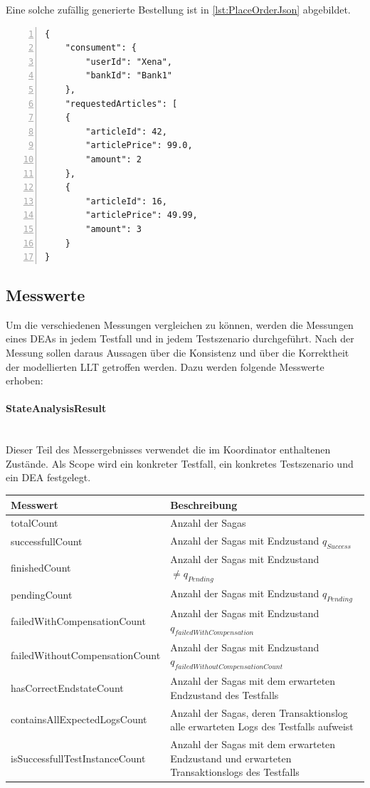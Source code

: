 Eine solche zufällig generierte Bestellung ist in \cref{lst:PlaceOrderJson} abgebildet.


\begin{lstlisting}[breaklines=true, tabsize=2, showstringspaces=false, frame=single, numbers=left, basicstyle=\small, label = {lst:PlaceOrderJson}, caption={Json für dynamisch generierte Bestellung}, captionpos=b] 
{
	"consument": {
		"userId": "Xena",
		"bankId": "Bank1"
	},
	"requestedArticles": [
	{
		"articleId": 42,
		"articlePrice": 99.0,
		"amount": 2
	},
	{
		"articleId": 16,
		"articlePrice": 49.99,
		"amount": 3
	}
}
\end{lstlisting}

\subsection{Messwerte}
Um die verschiedenen Messungen vergleichen zu können, werden die Messungen eines DEAs in jedem Testfall und in jedem Testszenario durchgeführt. Nach der Messung sollen daraus Aussagen über die Konsistenz und über die Korrektheit der modellierten LLT getroffen werden. Dazu werden folgende Messwerte erhoben:

\paragraph*{StateAnalysisResult} \mbox{}\\
Dieser Teil des Messergebnisses verwendet die im Koordinator enthaltenen Zustände. Als Scope wird ein konkreter Testfall, ein konkretes Testszenario und ein DEA festgelegt.

\begin{center}
\begin{longtable}[h]{|p{5cm}|p{12cm}|}
	\hline
	Messwert & Beschreibung \\ \hline
	totalCount & Anzahl der Sagas \\ \hline
	successfullCount & Anzahl der Sagas mit Endzustand $q_{Success}$ \\ \hline
	finishedCount & Anzahl der Sagas mit Endzustand $\not = q_{Pending}$ \\ \hline
	pendingCount & Anzahl der Sagas mit Endzustand $q_{Pending}$ \\ \hline
	failedWithCompensation\-Count & Anzahl der Sagas mit Endzustand $q_{failedWithCompensation}$ \\ \hline
	failedWithoutCompensation\-Count & Anzahl der Sagas mit Endzustand $q_{failedWithoutCompensationCount}$ \\ \hline
	hasCorrectEndstateCount & Anzahl der Sagas mit dem erwarteten Endzustand des Testfalls \\ \hline
	containsAllExpectedLogs\-Count & Anzahl der Sagas, deren Transaktionslog alle erwarteten Logs des Testfalls aufweist \\ \hline
	isSuccessfullTestInstance\-Count & Anzahl der Sagas mit dem erwarteten Endzustand und erwarteten Transaktionslogs des Testfalls \\ \hline
\end{longtable}
\end{center}
\FloatBarrier

